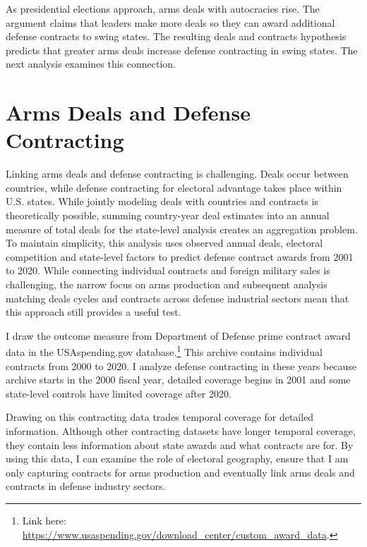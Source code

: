 \documentclass[12pt]{article}
\begin{document}
As presidential elections approach, arms deals with autocracies rise. 
The argument claims that leaders make more deals so they can award additional defense contracts to swing states. 
The resulting deals and contracts hypothesis predicts that greater arms deals increase defense contracting in swing states. 
The next analysis examines this connection.


\section{Arms Deals and Defense Contracting}


Linking arms deals and defense contracting is challenging. 
Deals occur between countries, while defense contracting for electoral advantage takes place within U.S. states.
While jointly modeling deals with countries and contracts is theoretically possible, summing country-year deal estimates into an annual measure of total deals for the state-level analysis creates an aggregation problem. %
To maintain simplicity, this analysis uses observed annual deals, electoral competition and state-level factors to predict defense contract awards from 2001 to 2020. 
While connecting individual contracts and foreign military sales is challenging, the narrow focus on arms production and subsequent analysis matching deals cycles and contracts across defense industrial sectors mean that this approach still provides a useful test. 



I draw the outcome measure from Department of Defense prime contract award data in the USAspending.gov database.\footnote{Link here: \url{https://www.usaspending.gov/download_center/custom_award_data}.} 
This archive contains individual contracts from 2000 to 2020.
I analyze defense contracting in these years because archive starts in the 2000 fiscal year, detailed coverage begins in 2001 and some state-level controls have limited coverage after 2020.


Drawing on this contracting data trades temporal coverage for detailed information. 
Although other contracting datasets have longer temporal coverage, they contain less information about state awards and what contracts are for. 
By using this data, I can examine the role of electoral geography, ensure that I am only capturing contracts for arms production and 
eventually link arms deals and contracts in defense industry sectors. 
\end{document}
